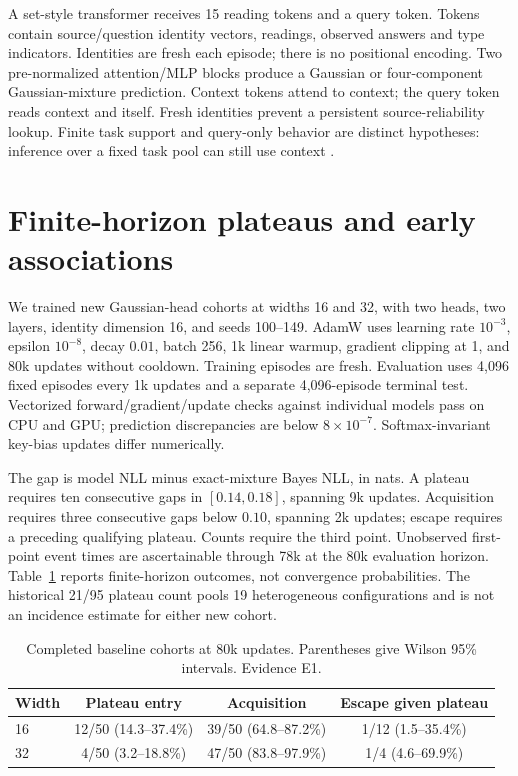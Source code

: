 \documentclass[10pt]{article}
\begin{document}
A set-style transformer receives 15 reading tokens and a query token. Tokens
contain source/question identity vectors, readings, observed answers and type
indicators. Identities are fresh each episode; there is no positional encoding.
Two pre-normalized attention/MLP blocks produce a Gaussian or four-component
Gaussian-mixture prediction. Context tokens attend to context; the query token
reads context and itself. Fresh identities prevent a persistent source-reliability
lookup. Finite task support and query-only behavior are distinct hypotheses:
inference over a fixed task pool can still use context \citep{raventos2023}.

\section{Finite-horizon plateaus and early associations}
We trained new Gaussian-head cohorts at widths 16 and 32, with two heads, two
layers, identity dimension 16, and seeds 100--149. AdamW uses learning rate
$10^{-3}$, epsilon $10^{-8}$, decay $0.01$, batch 256, 1k linear warmup,
gradient clipping at 1, and 80k updates without cooldown. Training episodes are
fresh. Evaluation uses 4,096 fixed episodes every 1k updates and a separate
4,096-episode terminal test. Vectorized forward/gradient/update checks against
individual models pass on CPU and GPU; prediction discrepancies are below
$8\times10^{-7}$. Softmax-invariant key-bias updates differ numerically.

The gap is model NLL minus exact-mixture Bayes NLL, in nats. A plateau requires
ten consecutive gaps in $[0.14,0.18]$, spanning 9k updates. Acquisition requires
three consecutive gaps below $0.10$, spanning 2k updates; escape requires a preceding
qualifying plateau. Counts require the third point. Unobserved first-point
event times are ascertainable through 78k at the 80k evaluation horizon.
Table~\ref{tab:cohorts} reports finite-horizon outcomes, not convergence
probabilities. The historical 21/95 plateau count pools 19 heterogeneous
configurations and is not an incidence estimate for either new cohort.

\begin{table}[t]
\centering\small
\begin{tabular}{lccc}
\toprule
Width & Plateau entry & Acquisition & Escape given plateau \\
\midrule
16 & 12/50 (14.3--37.4\%) & 39/50 (64.8--87.2\%) & 1/12 (1.5--35.4\%) \\
32 & 4/50 (3.2--18.8\%) & 47/50 (83.8--97.9\%) & 1/4 (4.6--69.9\%) \\
\bottomrule
\end{tabular}
\caption{Completed baseline cohorts at 80k updates. Parentheses give Wilson
95\% intervals. Evidence E1.}
\label{tab:cohorts}
\end{table}
\end{document}
